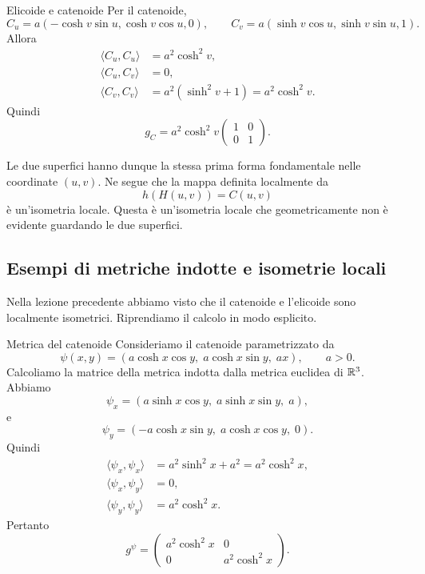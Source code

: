\documentclass[a4paper]{article}
\begin{document}
\begin{snippetexample}{Elicoide e catenoide}
Per il catenoide,
\[
    C_u
    =
    a(-\cosh v\sin u,\cosh v\cos u,0),
    \qquad
    C_v
    =
    a(\sinh v\cos u,\sinh v\sin u,1).
\]
Allora
\begin{align*}
    \langle C_u,C_u\rangle
    &=
    a^2\cosh^2 v,\\
    \langle C_u,C_v\rangle
    &=0,\\
    \langle C_v,C_v\rangle
    &=
    a^2(\sinh^2 v+1)
    =
    a^2\cosh^2 v.
\end{align*}
Quindi
\[
    g_C
    =
    a^2\cosh^2 v
    \begin{pmatrix}
        1 & 0\\
        0 & 1
    \end{pmatrix}.
\]

Le due superfici hanno dunque la stessa prima forma fondamentale nelle coordinate \((u,v)\). Ne segue che la mappa definita localmente da
\[
    h(H(u,v))=C(u,v)
\]
è un'isometria locale. Questa è un'isometria locale che geometricamente non è evidente guardando le due superfici.
\end{snippetexample}

\pagebreak

\subsection{Esempi di metriche indotte e isometrie locali}


Nella lezione precedente abbiamo visto che il catenoide e l'elicoide sono localmente isometrici. Riprendiamo il calcolo in modo esplicito.

\begin{snippetexample}{Metrica del catenoide}
Consideriamo il catenoide parametrizzato da
\[
    \psi(x,y)
    =
    (a\cosh x\cos y,\;a\cosh x\sin y,\;ax),
    \qquad
    a>0.
\]
Calcoliamo la matrice della metrica indotta dalla metrica euclidea di \(\mathbb{R}^3\). Abbiamo
\[
    \psi_x
    =
    (a\sinh x\cos y,\;a\sinh x\sin y,\;a),
\]
e
\[
    \psi_y
    =
    (-a\cosh x\sin y,\;a\cosh x\cos y,\;0).
\]
Quindi
\begin{align*}
    \langle \psi_x,\psi_x\rangle
    &=
    a^2\sinh^2x+a^2
    =
    a^2\cosh^2x,\\
    \langle \psi_x,\psi_y\rangle
    &=
    0,\\
    \langle \psi_y,\psi_y\rangle
    &=
    a^2\cosh^2x.
\end{align*}
Pertanto
\[
    g^\psi
    =
    \begin{pmatrix}
        a^2\cosh^2x & 0\\
        0 & a^2\cosh^2x
    \end{pmatrix}.
\]
\end{snippetexample}
\end{document}
